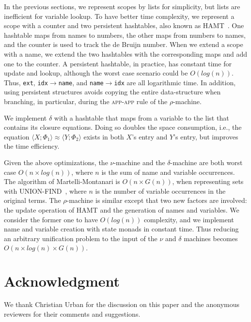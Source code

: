 \documentclass[a4paper,UKenglish]{lipics-v2016}
\newcommand{\clos}[2] {
  \langle #1; #2 \rangle
}
\newcommand{\aeq}[4] {
  \clos{#1}{#2} \approx \clos{#3}{#4}
}
\newcommand*{\transname}[1]{\textsc{#1}}
\begin{document}
In the previous sections, we represent scopes by lists for simplicity,
but lists are inefficient for variable lookup.  To have better time
complexity, we represent a scope with a counter and two persistent
hashtables, also known as HAMT~\citep{bagwell_ideal_2001}.  One
hashtable maps from names to numbers, the other maps from numbers to
names, and the counter is used to track the de Bruijn number.  When we
extend a scope with a name, we extend the two hashtables with the
corresponding maps and add one to the counter.  A persistent
hashtable, in practice, has constant time for update and lookup,
although the worst case scenario could be $O(log(n))$.  Thus,
\texttt{ext}, \texttt{idx$\rightarrow$name}, and
\texttt{name$\rightarrow$idx} are all logarithmic time.  In addition,
using persistent structures avoids copying the entire data-structure
when branching, in particular, during the \transname{app-app} rule of
the $\rho$-machine.

We implement $\delta$ with a hashtable that maps from a variable to
the list that contains its closure equations.  Doing so doubles the
space consumption, i.e., the equation $\aeq{X}{\Phi_1}{Y}{\Phi_2}$
exists in both $X$'s entry and $Y$'s entry, but improves the time
efficiency.

Given the above optimizations, the $\nu$-machine and the
$\delta$-machine are both worst case $O(n \times log(n))$,
where $n$ is the sum of name and variable occurrences.
The algorithm of Martelli-Montanari is $O(n \times G(n))$, when
representing sets with UNION-FIND~\citep{tarjan_efficiency_1975}, where
$n$ is the number of variable occurrences in the original terms.  The
$\rho$-machine is similar except that two new factors are involved:
the update operation of HAMT and the generation of names and
variables.  We consider the former one to have $O(log(n))$ complexity,
and we implement name and variable creation with state monads in
constant time.  Thus reducing an arbitrary unification problem to the
input of the $\nu$ and $\delta$ machines becomes $O(n \times log(n) \times
G(n))$.

\section*{Acknowledgment}
We thank Christian Urban for the discussion on this paper
and the anonymous reviewers for their comments and suggestions.

    \clearpage


\end{document}
